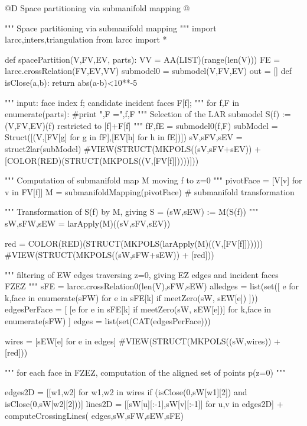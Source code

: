 \documentclass[11pt,oneside]{article}    %
\begin{document}
@D Space partitioning via submanifold mapping
@{""" Space partitioning via submanifold mapping """
import larcc,inters,triangulation
from larcc import *

def spacePartition(V,FV,EV, parts):
    VV = AA(LIST)(range(len(V)))
    FE = larcc.crossRelation(FV,EV,VV)
    submodel0 = submodel(V,FV,EV)
    out = []
    def isClose(a,b): return abs(a-b)<10**-5
    
    """ input: face index f; candidate incident faces F[f]; """
    for f,F in enumerate(parts):
        #print "\n\nf,F =",f,F
        """ Selection of the LAR submodel S(f) := (V,FV,EV)(f) restricted to [f]+F[f] """    
        fF,fE = submodel0(f,F)
        subModel = Struct([(V,[FV[g] for g in fF],[EV[h] for h in fE])])
        sV,sFV,sEV = struct2lar(subModel)
        #VIEW(STRUCT(MKPOLS((sV,sFV+sEV)) + [COLOR(RED)(STRUCT(MKPOLS((V,[FV[f]]))))]))
        
        """ Computation of submanifold map M moving f to z=0 """
        pivotFace = [V[v] for v in FV[f]]
        M = submanifoldMapping(pivotFace)  # submanifold transformation
        
        """ Transformation of S(f) by M, giving S = (sW,sEW) := M(S(f)) """
        sW,sFW,sEW = larApply(M)((sV,sFV,sEV))
        
        red = COLOR(RED)(STRUCT(MKPOLS(larApply(M)((V,[FV[f]])))))
        #VIEW(STRUCT(MKPOLS((sW,sFW+sEW)) + [red]))
        
        """ filtering of EW edges traversing z=0, giving EZ edges and incident faces FZEZ """
        sFE = larcc.crossRelation0(len(V),sFW,sEW)    
        alledges = list(set([ e for k,face in enumerate(sFW)  for e in sFE[k] 
                    if meetZero(sW, sEW[e]) ]))
        edgesPerFace = [ [e for e in sFE[k] if meetZero(sW, sEW[e])] 
                    for k,face in enumerate(sFW) ]
        edges = list(set(CAT(edgesPerFace)))
        
        wires = [sEW[e] for e in edges]
        #VIEW(STRUCT(MKPOLS((sW,wires)) + [red]))
        
        """ for each face in FZEZ, computation of the aligned set of points p(z=0) """
        
        edges2D = [[w1,w2] for w1,w2 in wires if (isClose(0,sW[w1][2]) and isClose(0,sW[w2][2]))]
        lines2D = [[sW[u][:-1],sW[v][:-1]] for u,v in edges2D] + computeCrossingLines(
                    edges,sW,sFW,sEW,sFE)
        
}
\end{document}
